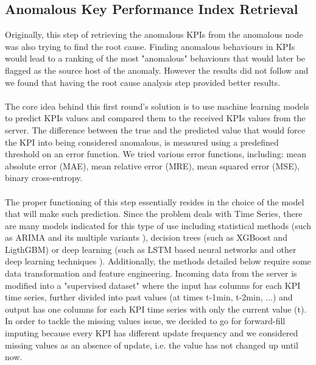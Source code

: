 \documentclass[acmsmall, screen, nonacm]{acmart}
\begin{document}
\subsection{Anomalous Key Performance Index Retrieval}
Originally, this step of retrieving the anomalous KPIs from the anomalous node was also trying to find the root cause. 
Finding anomalous behaviours in KPIs would lead to a ranking of the most "anomalous" behaviours that would later be flagged as the source host of the anomaly. 
However the results did not follow and we found that having the root cause analysis step provided better results. 
\\
\\
The core idea behind this first round's solution is to use machine learning models to predict KPIs values and compared them to the received KPIs values from the server. 
The difference between the true and the predicted value that would force the KPI into being considered anomalous, is measured using a predefined threshold on an error function. 
We tried various error functions, including: mean absolute error (MAE), mean relative error (MRE), mean squared error (MSE), binary cross-entropy.
\\
\\
The proper functioning of this step essentially resides in the choice of the model that will make such prediction. 
Since the problem deals with Time Series, there are many models indicated for this type of use including statistical methods (such as ARIMA and its multiple variants \cite{moayedi_arima_2008}),  decision trees (such as XGBoost and LigthGBM) or deep learning (such as LSTM based neural networks and other deep learning techniques \cite{kim_web_2018}). 
Additionally, the methods detailed below require some data transformation and feature engineering. 
Incoming data from the server is modified into a "supervised dataset" where the input has columns for each KPI time series, further divided into past values (at times t-1min, t-2min, ...) and output has one columns for each KPI time series with only the current value (t). 
In order to tackle the missing values issue, we decided to go for forward-fill imputing because every KPI has different update frequency and we considered missing values as an absence of update, i.e. the value has not changed up until now.
\\
\end{document}
